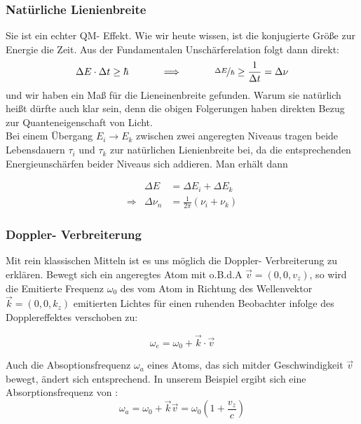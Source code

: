 \documentclass[a4paper,oneside]{article}
\begin{document}
\subsubsection{Natürliche Lienienbreite}
Sie ist ein echter QM- Effekt. Wie wir heute wissen, ist die konjugierte Größe zur Energie die Zeit. Aus der Fundamentalen Unschärferelation folgt dann direkt:
\begin{equation}
 \Delta E\cdot \Delta t\geq \hbar \;\;\;\;\;\;\;\;\;\;\;\;\Longrightarrow \;\;\;\;\;\;\;\;\;\;\;\;\nicefrac{\Delta E}{\hbar}\geq \frac{1}{\Delta t}=\Delta \nu
\end{equation}
und wir haben  ein Maß für die Lieneinenbreite gefunden. Warum sie natürlich heißt dürfte auch klar sein, denn die obigen Folgerungen haben direkten Bezug zur Quanteneigenschaft von Licht.\\
Bei einem Übergang $E_i\rightarrow E_k$ zwischen zwei angeregten Niveaus tragen beide Lebensdauern $\tau_i$ und $\tau_k$ zur natürlichen Lienienbreite bei, da die entsprechenden Energieunschärfen beider Niveaus sich addieren. Man erhält dann

\begin{eqnarray}
        & \Delta E &=\Delta E_i+\Delta E_k \nonumber\\
       \Rightarrow &\Delta \nu_n&= \frac{1}{2\pi}(\nu_i+\nu_k)
\end{eqnarray}


\subsubsection{Doppler- Verbreiterung}

Mit rein klassischen Mitteln ist es uns möglich die Doppler- Verbreiterung zu erklären. Bewegt sich ein angeregtes Atom mit o.B.d.A $\vec v=(0,0,v_z)$, so wird die Emitierte Frequenz $\omega_0$ des vom Atom in Richtung des Wellenvektor $\vec k=(0,0,k_z)$ emitierten Lichtes für einen ruhenden Beobachter infolge des Dopplereffektes verschoben zu:

\begin{equation}
 \omega_e=\omega_0+\vec k\cdot\vec v
\end{equation}

Auch die Absoptionsfrequenz $\omega_a$ eines Atoms, das sich mitder Geschwindigkeit $\vec v$ bewegt, ändert sich entsprechend. In unserem Beispiel ergibt sich eine Absorptionsfrequenz von :
\begin{equation}
 \omega_a=\omega_0+\vec k \vec v=\omega_0\left(1+\frac{v_z}{c}\right)
 \label{doppler_beziehung}
\end{equation}
\end{document}
